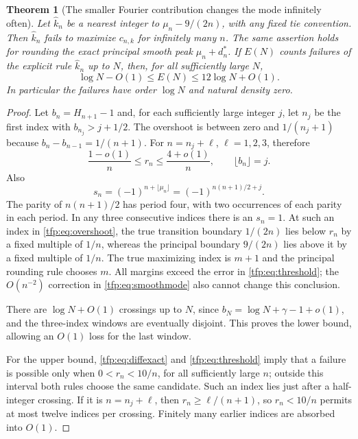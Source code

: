 \documentclass[11pt,a4paper]{article}
\numberwithin{equation}{section}
\newtheorem{theorem}{Theorem}[section]
\theoremstyle{definition}\newtheorem{definition}[theorem]{Definition}
\theoremstyle{remark}\newtheorem{remark}[theorem]{Remark}
\begin{document}
\begin{theorem}[The smaller Fourier contribution changes the mode
infinitely often]\label{tfp:thm:failures}
Let $\widehat k_n$ be a nearest integer to
$\mu_n-9/(2n)$, with any fixed tie convention. Then $\widehat k_n$ fails
to maximize $c_{n,k}$ for infinitely many $n$. The same assertion holds
for rounding the exact principal smooth peak
$\mu_n+d_n^*$.
If $E(N)$ counts failures of the explicit rule $\widehat k_n$ up to $N$,
then, for all sufficiently large $N$,
\begin{equation}\label{tfp:eq:failurecount}
 \log N-O(1)\le E(N)\le12\log N+O(1).
\end{equation}
In particular the failures have order $\log N$ and natural density zero.
\end{theorem}
\begin{proof}
Let $b_n=H_{n+1}-1$ and, for each sufficiently large integer $j$, let
$n_j$ be the first index with $b_{n_j}>j+1/2$.
The overshoot is between zero and $1/(n_j+1)$ because
$b_n-b_{n-1}=1/(n+1)$. For $n=n_j+\ell$, $\ell=1,2,3$, therefore
\begin{equation}\label{tfp:eq:overshoot}
 \frac{1-o(1)}n\le r_n\le\frac{4+o(1)}n,
 \qquad \lfloor b_n\rfloor=j.
\end{equation}
Also
\[
 s_n=(-1)^{n+\lfloor\mu_n\rfloor}
     =(-1)^{n(n+1)/2+j}.
\]
The parity of $n(n+1)/2$ has period four, with two occurrences of each
parity in each period. In any three consecutive indices there is an
$s_n=1$. At such an index in \eqref{tfp:eq:overshoot}, the true transition
boundary $1/(2n)$ lies below $r_n$ by a fixed multiple of $1/n$,
whereas the principal boundary $9/(2n)$ lies above it by a fixed
multiple of $1/n$. The true maximizing index is $m+1$ and the
principal rounding rule chooses $m$. All margins exceed the error in
\eqref{tfp:eq:threshold}; the $O(n^{-2})$ correction in
\eqref{tfp:eq:smoothmode} also cannot change this conclusion.

There are $\log N+O(1)$ crossings up to $N$, since
$b_N=\log N+\gamma-1+o(1)$, and the three-index windows are eventually
disjoint. This proves the lower bound, allowing an $O(1)$ loss for
the last window.

For the upper bound, \eqref{tfp:eq:diffexact} and
\eqref{tfp:eq:threshold} imply that a failure is possible only when
$0<r_n<10/n$, for all sufficiently large $n$; outside this interval
both rules choose the same candidate. Such an index lies just after a
half-integer crossing. If it is $n=n_j+\ell$, then
$r_n\ge\ell/(n+1)$, so $r_n<10/n$ permits at most twelve indices per
crossing. Finitely many earlier indices are absorbed into $O(1)$.
\end{proof}
\end{document}
